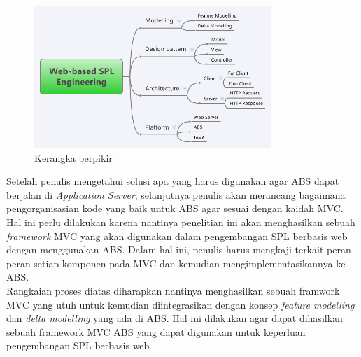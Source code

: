 \begin{figure}
    \centering
    \includegraphics[width=0.8\textwidth]
        {img/kerangka-berpikir.png}
    \caption{Kerangka berpikir}
\end{figure}

\noindent
Setelah penulis mengetahui solusi apa yang harus digunakan agar ABS dapat berjalan di \textit{Application Server}, selanjutnya penulis akan merancang bagaimana pengorganisasian kode yang baik untuk ABS agar sesuai dengan kaidah MVC. Hal ini perlu dilakukan karena nantinya penelitian ini akan menghasilkan sebuah \textit{framework} MVC yang akan digunakan dalam pengembangan SPL berbasis web dengan menggunakan ABS. Dalam hal ini, penulis harus mengkaji terkait peran-peran setiap komponen pada MVC dan kemudian mengimplementasikannya ke ABS. \\

\noindent
Rangkaian proses diatas diharapkan nantinya menghasilkan sebuah framwork MVC yang utuh untuk kemudian diintegrasikan dengan konsep \textit{feature modelling} dan \textit{delta modelling} yang ada di ABS. Hal ini dilakukan agar dapat dihasilkan sebuah framework MVC ABS yang dapat digunakan untuk keperluan pengembangan SPL berbasis web.

